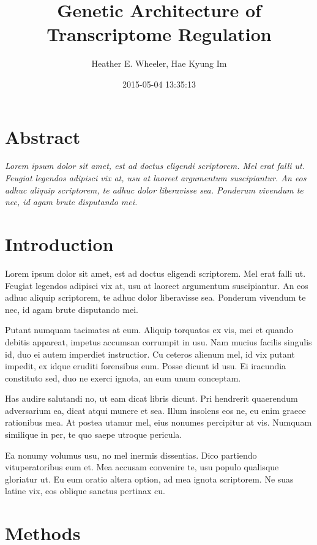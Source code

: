 \documentclass[]{article}
\title{Genetic Architecture of Transcriptome Regulation}
\author{Heather E. Wheeler, Hae Kyung Im}
\date{2015-05-04 13:35:13}
\begin{document}
\maketitle


\section{Abstract}\label{abstract}

\emph{Lorem ipsum dolor sit amet, est ad doctus eligendi scriptorem. Mel
erat falli ut. Feugiat legendos adipisci vix at, usu at laoreet
argumentum suscipiantur. An eos adhuc aliquip scriptorem, te adhuc dolor
liberavisse sea. Ponderum vivendum te nec, id agam brute disputando
mei.}

\section{Introduction}\label{introduction}

Lorem ipsum dolor sit amet, est ad doctus eligendi scriptorem. Mel erat
falli ut. Feugiat legendos adipisci vix at, usu at laoreet argumentum
suscipiantur. An eos adhuc aliquip scriptorem, te adhuc dolor
liberavisse sea. Ponderum vivendum te nec, id agam brute disputando mei.

Putant numquam tacimates at eum. Aliquip torquatos ex vis, mei et quando
debitis appareat, impetus accumsan corrumpit in usu. Nam mucius facilis
singulis id, duo ei autem imperdiet instructior. Cu ceteros alienum mel,
id vix putant impedit, ex idque eruditi forensibus eum. Posse dicunt id
usu. Ei iracundia constituto sed, duo ne exerci ignota, an eum unum
conceptam.

Has audire salutandi no, ut eam dicat libris dicunt. Pri hendrerit
quaerendum adversarium ea, dicat atqui munere et sea. Illum insolens eos
ne, eu enim graece rationibus mea. At postea utamur mel, eius nonumes
percipitur at vis. Numquam similique in per, te quo saepe utroque
pericula.

Ea nonumy volumus usu, no mel inermis dissentias. Dico partiendo
vituperatoribus eum et. Mea accusam convenire te, usu populo qualisque
gloriatur ut. Eu eum oratio altera option, ad mea ignota scriptorem. Ne
suas latine vix, eos oblique sanctus pertinax cu.

\section{Methods}\label{methods}
\end{document}
